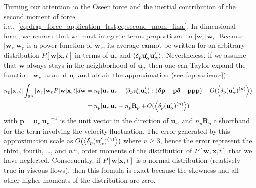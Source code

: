 Turning our attention to the Oseen force and the inertial contribution of the second moment of force i.e.,~\ref{eq:drag_force_application_last,eq:second_mom_final}. 
In dimensional form, we remark that we must integrate terms proportional to $|\textbf{w}_r|\textbf{w}_r$.
Because  $|\textbf{w}_r|\textbf{w}_r$ is a power function of $\textbf{w}_r$, its average cannot be written for an arbitrary distribution $P[\textbf{w}|\textbf{x},t]$ in terms of $\textbf{u}_r$ and $\left<\delta_{p} \textbf{u}_\alpha'\textbf{u}_\alpha'\right>$.  
Nevertheless, if we assume that $\textbf{w}$ always stays in the neighborhood of $\textbf{u}_p$, then one can Taylor expand the function $|\textbf{w}_r|$ around $\textbf{u}_r$ and obtain the approximation (see~\ref{ap:varience}): 
\begin{align}
    n_p[\textbf{x},t]  \int_{\mathbb{R}^3} 
    |\textbf{w}_r| \textbf{w}_r
    P[\textbf{w}|\textbf{x},t]
    d\textbf{w}
    &=
    n_p  
    |\textbf{u}_r|\textbf{u}_r + 
    \pavg{\textbf{u}_\alpha'\textbf{u}_\alpha'}:
    (\bm\delta \textbf{p} +\textbf{p} \bm\delta  - \textbf{ppp})
    +O(\pavg{(\textbf{u}_\alpha')^{(n)}})\nonumber \\
    &=
    n_p  
    |\textbf{u}_r|\textbf{u}_r + 
    n_p \textbf{R}_p
    +O(\pavg{(\textbf{u}_\alpha')^{(n)}})
    \label{eq:standard_dev2}
\end{align}
with $\textbf{p} = \textbf{u}_r|\textbf{u}_r|^{-1}$ is the unit vector in the direction of $\textbf{u}_r$, and $n_p\textbf{R}_p$ a shorthand for the term involving the velocity fluctuation. 
The error generated by this approximation scale as $O(\left<\delta_{p} (\textbf{u}_\alpha')^{(n)}\right>)$ where $n\ge 3$, hence the error represent the third, fourth, \ldots, and $n^{th}$, order moments of the distribution of $P[\textbf{w},\textbf{x},t]$ that we have neglected.
Consequently, if  $P[\textbf{w}|\textbf{x},t]$ is a normal distribution (relatively true in viscous flows), then this formula is exact because the skewness and all other higher moments of the distribution  are zero. 


